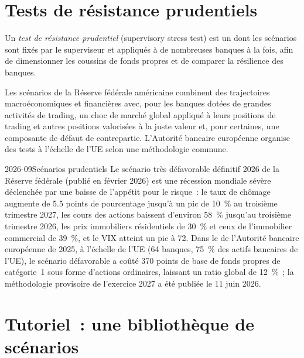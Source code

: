 \section{Tests de résistance prudentiels}

\begin{definition}\label{def:rc:stress-testing-and-scenarios:supervisory}
Un \emph{test de résistance prudentiel} (supervisory stress test) est un  dont les scénarios
sont fixés par le superviseur et appliqués à de nombreuses banques à la fois, afin de dimensionner les coussins de fonds propres et de comparer
la résilience des banques.
\end{definition}

Les scénarios de la Réserve fédérale américaine combinent des trajectoires macroéconomiques et financières avec, pour les banques
dotées de grandes activités de trading, un choc de marché global appliqué à leurs positions de trading et autres positions valorisées
à la juste valeur et, pour certaines, une composante de défaut de contrepartie. L'Autorité bancaire européenne organise
des tests à l'échelle de l'UE selon une méthodologie commune.

\begin{dated}{2026-09}{Scénarios prudentiels}\label{dat:rc:stress-testing-and-scenarios:fed}
Le scénario très défavorable définitif 2026 de la Réserve fédérale (publié en février 2026) est une récession
mondiale sévère déclenchée par une baisse de l'appétit pour le risque~: le taux de chômage augmente de 5.5 points
de pourcentage jusqu'à un pic de 10~\% au troisième trimestre 2027, les cours des actions baissent d'environ 58~\% jusqu'au
troisième trimestre 2026, les prix immobiliers résidentiels de 30~\% et ceux de l'immobilier commercial de 39~\%, et le VIX atteint un pic
à 72. Dans le  de l'Autorité bancaire européenne de 2025, à l'échelle de l'UE (64 banques, 75~\% des actifs bancaires de l'UE), le
scénario défavorable a coûté 370 points de base de fonds propres de catégorie~1 sous forme d'actions ordinaires, laissant un ratio global de 12~\%~; la
méthodologie provisoire de l'exercice 2027 a été publiée le 11 juin 2026.
\end{dated}

\section{Tutoriel~: une bibliothèque de scénarios}\label{tut:rc:stress-testing-and-scenarios:tutorial}


